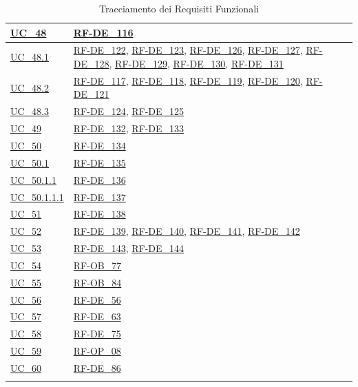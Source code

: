 \begin{longtable}{|
        >{\raggedright\arraybackslash}p{} |
        >{\raggedright\arraybackslash}p{} |
    }
    \hyperref[uc_48]{UC\_48} & \hyperlink{rf-de_116}{RF-DE\_116} \\
    \hline
    \hyperref[uc_48.1]{UC\_48.1} & \hyperlink{rf-de_122}{RF-DE\_122}, \hyperlink{rf-de_123}{RF-DE\_123}, \hyperlink{rf-de_126}{RF-DE\_126}, \hyperlink{rf-de_127}{RF-DE\_127}, \hyperlink{rf-de_128}{RF-DE\_128}, \hyperlink{rf-de_129}{RF-DE\_129}, \hyperlink{rf-de_130}{RF-DE\_130}, \hyperlink{rf-de_131}{RF-DE\_131} \\
    \hline
    \hyperref[uc_48.2]{UC\_48.2} & \hyperlink{rf-de_117}{RF-DE\_117}, \hyperlink{rf-de_118}{RF-DE\_118}, \hyperlink{rf-de_119}{RF-DE\_119}, \hyperlink{rf-de_120}{RF-DE\_120}, \hyperlink{rf-de_121}{RF-DE\_121} \\
    \hline
    \hyperref[uc_48.3]{UC\_48.3} & \hyperlink{rf-de_124}{RF-DE\_124}, \hyperlink{rf-de_125}{RF-DE\_125} \\
    \hline
    \hyperref[uc_49]{UC\_49} & \hyperlink{rf-de_132}{RF-DE\_132}, \hyperlink{rf-de_133}{RF-DE\_133} \\
    \hline
    \hyperref[uc_50]{UC\_50} & \hyperlink{rf-de_134}{RF-DE\_134} \\
    \hline
    \hyperref[uc_50.1]{UC\_50.1} & \hyperlink{rf-de_135}{RF-DE\_135} \\
    \hline
    \hyperref[uc_50.1.1]{UC\_50.1.1} & \hyperlink{rf-de_136}{RF-DE\_136} \\
    \hline
    \hyperref[uc_50.1.1.1]{UC\_50.1.1.1} & \hyperlink{rf-de_137}{RF-DE\_137} \\
    \hline
    \hyperref[uc_51]{UC\_51} & \hyperlink{rf-de_138}{RF-DE\_138} \\
    \hline
    \hyperref[uc_52]{UC\_52} & \hyperlink{rf-de_139}{RF-DE\_139}, \hyperlink{rf-de_140}{RF-DE\_140}, \hyperlink{rf-de_141}{RF-DE\_141}, \hyperlink{rf-de_142}{RF-DE\_142} \\
    \hline
    \hyperref[uc_53]{UC\_53} & \hyperlink{rf-de_143}{RF-DE\_143}, \hyperlink{rf-de_144}{RF-DE\_144}\\
    \hline
    \hyperref[uc_54]{UC\_54} & \hyperlink{rf-ob_77}{RF-OB\_77} \\
    \hline
    \hyperref[uc_55]{UC\_55} & \hyperlink{rf-ob_84}{RF-OB\_84} \\
    \hline
    \hyperref[uc_56]{UC\_56} & \hyperlink{rf-de_56}{RF-DE\_56} \\
    \hline
    \hyperref[uc_57]{UC\_57} & \hyperlink{rf-de_63}{RF-DE\_63} \\
    \hline
    \hyperref[uc_58]{UC\_58} & \hyperlink{rf-de_75}{RF-DE\_75} \\
    \hline
    \hyperref[uc_59]{UC\_59} & \hyperlink{rf-op_8}{RF-OP\_08} \\
    \hline
    \hyperref[uc_60]{UC\_60} & \hyperlink{rf-de_86}{RF-DE\_86} \\
    \hline

    \caption{Tracciamento dei Requisiti Funzionali}
    \label{tab:tracciamento}
\end{longtable}

